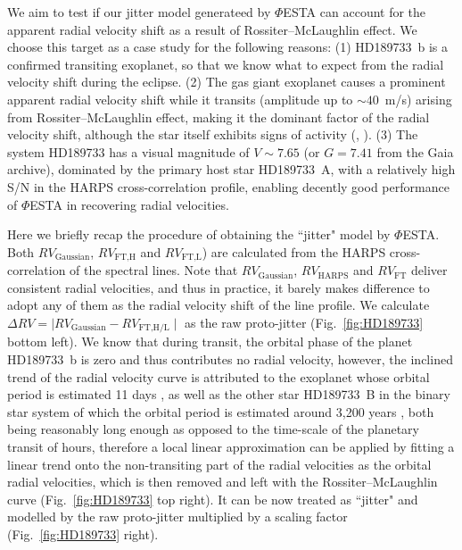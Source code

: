 We aim to test if our jitter model generateed by $\mathit{\Phi}$ESTA can account for the apparent radial velocity shift as a result of Rossiter–McLaughlin effect. We choose this target as a case study for the following reasons: (1) HD189733~b is a confirmed transiting exoplanet, so that we know what to expect from the radial velocity shift during the eclipse. (2) The gas giant exoplanet causes a prominent apparent radial velocity shift while it transits (amplitude up to $\sim 40$~m/s) arising from Rossiter–McLaughlin effect, making it the dominant factor of the radial velocity shift, although the star itself exhibits signs of activity (\cite{Boisse189733}, \cite{Cauley2017}). (3) The system HD189733 has a visual magnitude of $V\sim7.65$ \cite{SIMBAD189733} (or $G=7.41$ from the Gaia archive), dominated by the primary host star HD189733~A, with a relatively high S/N in the HARPS cross-correlation profile, enabling decently good performance of $\mathit{\Phi}$ESTA in recovering radial velocities.

Here we briefly recap the procedure of obtaining the ``jitter" model by $\mathit{\Phi}$ESTA. Both $RV_\text{Gaussian}$, $RV_\text{FT,H}$ and $RV_\text{FT,L}$) are calculated from the HARPS cross-correlation of the spectral lines. Note that $RV_\text{Gaussian}$, $RV_\text{HARPS}$ and $RV_\text{FT}$ deliver consistent radial velocities, and thus in practice, it barely makes difference to adopt any of them as the radial velocity shift of the line profile. We calculate $\Delta RV = \mid RV_\text{Gaussian} - RV_\text{FT,H/L} \mid$ as the raw proto-jitter (Fig.~\ref{fig:HD189733} bottom left).
We know that during transit, the orbital phase of the planet HD189733~b is zero and thus contributes no radial velocity, however, the inclined trend of the radial velocity curve is attributed to the exoplanet whose orbital period is estimated 11 days \cite{Bouchy2005ELODIE}, as well as the other star HD189733~B in the binary star system of which the orbital period is estimated around 3,200 years \cite{Bakos2006}, both being reasonably long enough as opposed to the time-scale of the planetary transit of hours, therefore a local linear approximation can be applied by fitting a linear trend onto the non-transiting part of the radial velocities as the orbital radial velocities, which is then removed and left with the Rossiter–McLaughlin curve (Fig.~\ref{fig:HD189733} top right). It can be now treated as ``jitter" and modelled by the raw proto-jitter multiplied by a scaling factor (Fig.~\ref{fig:HD189733} right). 

